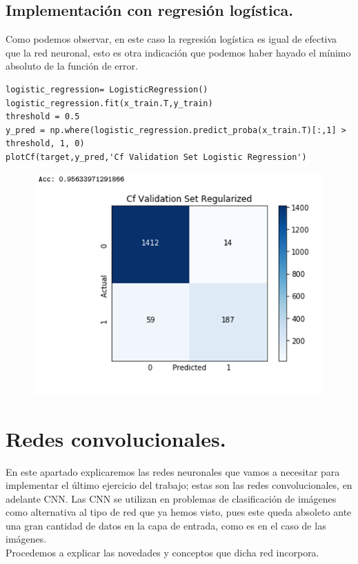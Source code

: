 \documentclass[a4paper,10pt]{article}
\begin{document}
\subsection{Implementación con regresión logística.}
Como podemos observar, en este caso la regresión logística es igual de efectiva que la red neuronal, esto es otra indicación que podemos haber hayado el mínimo absoluto de la función de error.
\begin{lstlisting}
logistic_regression= LogisticRegression()
logistic_regression.fit(x_train.T,y_train)
threshold = 0.5
y_pred = np.where(logistic_regression.predict_proba(x_train.T)[:,1] > threshold, 1, 0)
plotCf(target,y_pred,'Cf Validation Set Logistic Regression')
\end{lstlisting}
\begin{figure}[H]
\centering
\includegraphics[width=12.0cm, height=8.5cm]{Annotation 2020-03-23 161410}
\end{figure}

\newpage
\section{Redes convolucionales.}
En este apartado explicaremos las redes neuronales que vamos a necesitar para implementar el último ejercicio del trabajo; estas son las redes convolucionales, en adelante CNN. Las CNN se utilizan en problemas de clasificación de imágenes como alternativa al tipo de red que ya hemos visto, pues este queda absoleto ante una gran cantidad de datos en la capa de entrada, como es en el caso de las imágenes.\\ Procedemos a explicar las novedades y conceptos que dicha red incorpora.\\
\end{document}
